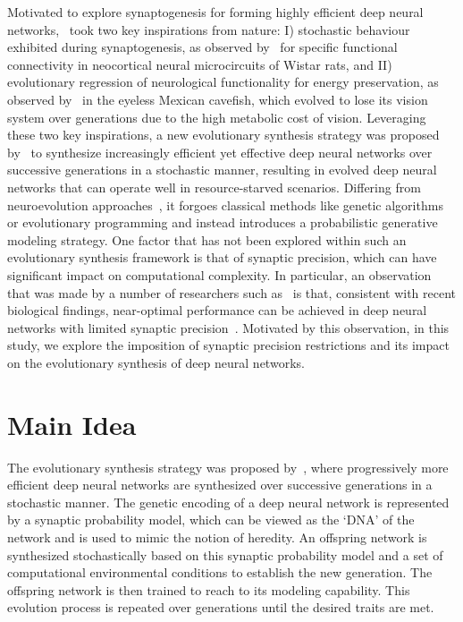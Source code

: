 \documentclass[10pt,letterpaper]{article}
\begin{document}
	Motivated to explore synaptogenesis for forming highly efficient deep neural networks,~ took two key inspirations from nature: I) stochastic behaviour exhibited during synaptogenesis, as observed by~ for specific functional connectivity in neocortical neural microcircuits of Wistar rats, and II) evolutionary regression of neurological functionality for energy preservation, as observed by~\cite{moran2015energetic} in the eyeless Mexican cavefish, which evolved to lose its vision system over generations due to the high metabolic cost of vision.  Leveraging these two key inspirations, a new evolutionary synthesis strategy was proposed by~\cite{javad2016evonet,shafiee2016evolutionary} to synthesize increasingly efficient yet effective deep neural networks over successive generations in a stochastic manner, resulting in evolved deep neural networks that can operate well in resource-starved scenarios. Differing from neuroevolution approaches~\cite{stanley2002evolving}, it forgoes classical methods like genetic algorithms or evolutionary programming and instead introduces a probabilistic generative modeling strategy.  One factor that has not been explored within such an evolutionary synthesis framework is that of synaptic precision, which can have significant impact on computational complexity.  In particular, an observation that was made by a number of researchers such as~ is that, consistent with recent biological findings, near-optimal performance can be achieved in deep neural networks with limited synaptic precision~\cite{gupta2015deep,hubara2016quantized}.  Motivated by this observation, in this study, we explore the imposition of synaptic precision restrictions and its impact on the evolutionary synthesis of deep neural networks.

\vspace{-0.2cm }
\section{Main Idea}
\vspace{-0.1 cm}
The evolutionary synthesis strategy was proposed by~, where progressively more efficient deep neural networks are synthesized over successive generations in a stochastic manner. The genetic encoding of a deep neural network is represented by a synaptic probability model, which can be viewed as the `DNA' of the network and is used to mimic the notion of heredity.  An offspring network is synthesized stochastically based on this synaptic probability model and a set of computational environmental conditions to establish the new generation. The offspring network  is then trained to reach to its modeling capability. This evolution process is repeated over generations until the desired traits are met.
\end{document}
